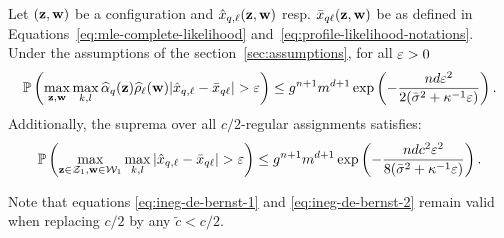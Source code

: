 \begin{proposition}[Maximum in $(\bz, \bw)$] \label{proposition:maxzw}
  Let $(\bz, \bw)$ be a configuration and $\hat{x}_{q, \ell}(\mathbf{z}, \mathbf{w})$ resp. $\bar{x}_{q\ell}(\mathbf{z}, \mathbf{w})$ be as defined in Equations~\eqref{eq:mle-complete-likelihood} and~\eqref{eq:profile-likelihood-notations}. Under the assumptions of the section~\ref{sec:assumptions}, for all $\varepsilon>0$
  \begin{equation}
    \label{eq:ineg-de-bernst-1}
    \Prob \left(\max_{\bz, \bw} \max_{k,l} \pizk \rhowl |\hat{x}_{\kk, \el} - \barxkl| > \vareps \right)  \leq  \g^{\n+1} \m^{\dd + 1} \exp \left( - \frac{nd\vareps^2}{2(\bar{\sigma}^2 + \neighborsize^{-1}\vareps)}\right). \\
  \end{equation}
  Additionally, the suprema over all $c/2$-regular  assignments satisfies:
  \begin{equation}
    \label{eq:ineg-de-bernst-2}
    \Prob \left(\max_{\bz \in \mcZ_1, \bw \in \mcW_1} \max_{k,l} |\hat{x}_{\kk, \el} - \barxkl| > \vareps \right) \leq  \g^{\n+1} \m^{\dd + 1} \exp \left( - \frac{ndc^2\vareps^2}{8(\bar{\sigma}^2 + \neighborsize^{-1}\vareps)}\right). \\
  \end{equation}
\end{proposition}
Note that equations \ref{eq:ineg-de-bernst-1} and \ref{eq:ineg-de-bernst-2} remain valid when replacing $c/2$ by any $\tilde c < c/2
$.
\proofbegin

